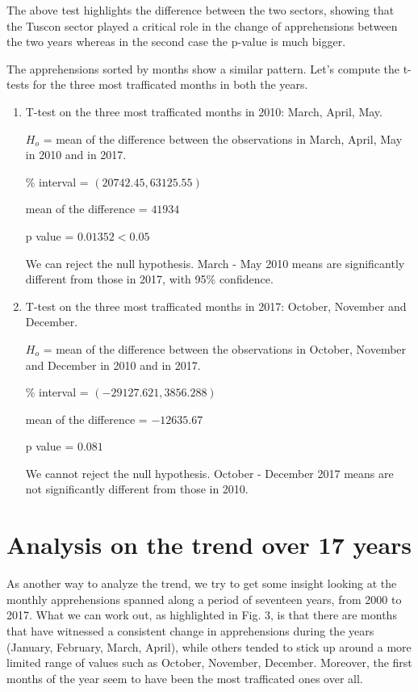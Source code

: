 \documentclass[journal, a4paper]{IEEEtran}
\begin{document}
The above test highlights the difference between the two sectors, showing that the Tuscon sector played a critical role in the change of apprehensions between the two years whereas in the second case the p-value is much bigger.

The apprehensions sorted by months show a similar pattern. Let's compute the t-tests for the three most trafficated months in both the years.

\begin{enumerate}

\item  T-test on the three most trafficated months in 2010: March, April, May.

  \subitem $ H_{o} $ = mean of the difference between the observations in March, April, May in 2010  and in 2017.

  \% interval = $ (20742.45, 63125.55) $

  \subitem mean of the difference = $  41934  $

  \subitem p value = $ 0.01352 < 0.05$


We can reject the null hypothesis. March - May 2010 means are significantly different from those in 2017, with 95\% confidence. 

\item  T-test on the three most trafficated months in 2017:  October, November and December.

  \subitem $ H_{o} $ = mean of the difference between the observations in October, November and December in 2010  and in 2017.

  \% interval = $ (-29127.621,  3856.288) $

  \subitem mean of the difference = $ -12635.67  $

  \subitem p value = $ 0.081 $


We cannot reject the null hypothesis. October - December 2017 means are not significantly different from those in 2010. 

\end{enumerate}






	\section{Analysis on the trend over 17 years}


As another way to analyze the trend, we try to get some insight looking at the monthly apprehensions spanned along a period of seventeen years, from 2000 to 2017. 
What we can work out, as highlighted in Fig. 3, is that there are months that have witnessed a consistent change in apprehensions during the years (January, February, March, April), while others tended to stick up around a more limited range of values such as October, November, December. Moreover, the first months of the year seem to have been the most trafficated ones over all. 
\end{document}
